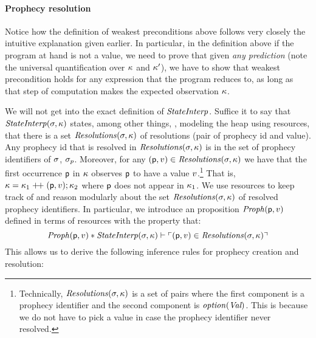 \documentclass{article}
\begin{document}
\paragraph{Prophecy resolution}
Notice how the definition of weakest preconditions above follows very
closely the intuitive explanation given earlier. In particular, in the
definition above if the program at hand is not a value, we need to
prove that given \emph{any prediction} (note the universal
quantification over $\kappa$ and $\kappa'$), we have to
show that weakest precondition holds for any expression that the
program reduces to, as long as that step of computation makes the
expected observation $\kappa$.

We will not get into the exact definition of $\mathit{StateInterp}$. Suffice
it to say that $\mathit{StateInterp}(\sigma, \kappa)$ states, among
other things, \eg, modeling the heap using \Iris{} resources, that
there is a set $\mathit{Resolutions}(\sigma, \kappa)$ of resolutions
(pair of prophecy id and value). Any prophecy id that is resolved in
$\mathit{Resolutions}(\sigma, \kappa)$ is in the set of prophecy
identifiers of $\sigma$, $\sigma_p$. Moreover, for any
$(\mathsf{p}, v) \in \mathit{Resolutions}(\sigma, \kappa)$ we have that
the first occurrence $\mathsf{p}$ in $\kappa$ observes $\mathsf{p}$ to
have a value $v$.\footnote{Technically,
  $\mathit{Resolutions}(\sigma, \kappa)$ is a set of pairs where the
  first component is a prophecy identifier and the second component is
  $\mathit{option}(\textit{Val})$. This is because we do not have to pick a
  value in case the prophecy identifier never resolved. } That is,
$\kappa = \kappa_1 \mathrel{+\!+} (\mathsf{p}, v); \kappa_2$
where $\mathsf{p}$ does not appear in $\kappa_1$. We use \Iris{}
resources to keep track of and reason modularly about the set
$\mathit{Resolutions}(\sigma, \kappa)$ of resolved prophecy
identifiers. In particular, we introduce an \Iris{} proposition
$\mathit{Proph}(\mathsf{p}, v)$ defined in terms of \Iris{} resources with
the property that:
\[
  \mathit{Proph}(\mathsf{p}, v) \ast \mathit{StateInterp}(\sigma, \kappa)
  \vdash \ulcorner (\mathsf{p}, v) \in \mathit{Resolutions}(\sigma,
    \kappa) \urcorner
\]
This allows us to derive the following inference rules for prophecy
creation and resolution:
\end{document}
